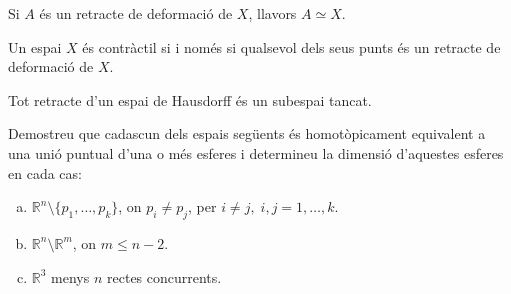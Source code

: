 \documentclass[../main.tex]{subfiles}
\begin{document}
\begin{prop}
Si $A$ és un retracte de deformació de $X$, llavors $A\simeq X$.
\end{prop}

\begin{prop}
Un espai $X$ és contràctil si i només si qualsevol dels seus punts és un retracte de deformació de $X$.
\end{prop}

\begin{prop}
Tot retracte d'un espai de Hausdorff és un subespai tancat.
\end{prop}

\begin{exercici}
[Exercici 14]\label{exercici1.14} Demostreu que cadascun dels espais següents és homotòpicament equivalent a una unió puntual d'una o més esferes i determineu la dimensió d'aquestes esferes en cada cas:
\begin{enumerate}[(a)]
    \item $\mathbb{R}^n\setminus\{p_1,\ldots,p_k\}$, on $p_i\not=p_j$, per $i\not=j,\;i,j=1,\ldots,k$.
    \item $\mathbb{R}^n\setminus \mathbb{R}^m$, on $m\leq n-2$.
    \item $\mathbb{R}^3$ menys $n$ rectes concurrents.
\end{enumerate}
\end{exercici}
\end{document}
